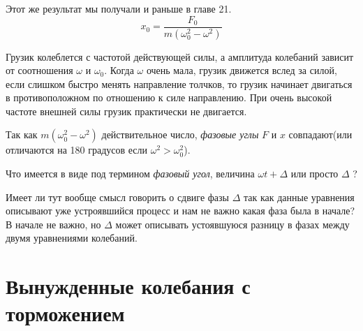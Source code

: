 \documentclass[12pt]{article}
\begin{document}
\medskip

Этот же результат мы получали и раньше в главе 21.
\[
    x_0 = \frac{F_0}{m(\omega_0^2-\omega^2)}
\]


Грузик колеблется с частотой действующей силы, а амплитуда колебаний зависит от соотношения $\omega$ и $\omega_0$. Когда $\omega$ очень мала, грузик движется вслед за силой, если слишком быстро менять направление толчков, то грузик начинает двигаться в противоположном по отношению к силе направлению. При очень высокой частоте внешней силы грузик практически не двигается.

Так как $m(\omega_0^2-\omega^2)$ действительное число, \textit{фазовые углы} $F$ и $x$ совпадают(или отличаются на 180 градусов если $\omega^2 > \omega_0^2$).

Что имеется в виде под термином \textit{фазовый угол}, величина $\omega t+\Delta$ или просто $\Delta$ ?

Имеет ли тут вообще смысл говорить о сдвиге фазы $\Delta$ так как данные уравнения описывают уже устроявшийся процесс и нам не важно какая фаза была в начале? В начале не важно, но $\Delta$ может описывать устоявшуюся разницу в фазах между двумя уравнениями колебаний.

\section{Вынужденные колебания с торможением}
\end{document}

